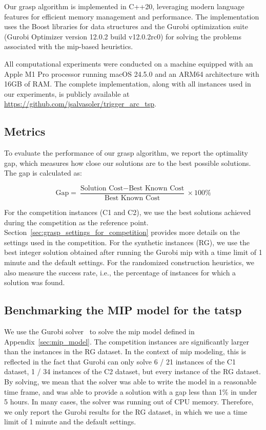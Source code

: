\documentclass[twocolumn, switch]{article} %
\begin{document}
Our \gls{grasp} algorithm is implemented in C++20, leveraging modern language features for efficient memory management and performance.
The implementation uses the Boost libraries for data structures and the Gurobi optimization suite (Gurobi Optimizer version 12.0.2 build v12.0.2rc0) for solving the problems associated with the \gls{mip}-based heuristics.

All computational experiments were conducted on a machine equipped with an Apple M1 Pro processor running macOS 24.5.0 and an ARM64 architecture with 16GB of RAM.
The complete implementation, along with all instances used in our experiments, is publicly available at \url{https://github.com/jsalvasoler/trigger_arc_tsp}.

\subsection{Metrics}

To evaluate the performance of our \gls{grasp} algorithm, we report the optimality gap, which measures how close our solutions are to the best possible solutions. The gap is calculated as:

\begin{equation}
\text{Gap} = \frac{\text{Solution Cost} - \text{Best Known Cost}}{\text{Best Known Cost}} \times 100\%
\end{equation}

For the competition instances (C1 and C2), we use the best solutions achieved during the competition as the reference point. Section~\ref{sec:grasp_settings_for_competition} provides more details on the settings used in the competition.
For the synthetic instances (RG), we use the best integer solution obtained after running the Gurobi \gls{mip} with a time limit of 1 minute and the default settings.
For the randomized construction heuristics, we also measure the success rate, i.e., the percentage of instances for which a solution was found.

\subsection{Benchmarking the MIP model for the \gls{tatsp}}

We use the Gurobi solver~\cite{gurobi} to solve the \gls{mip} model defined in Appendix~\ref{sec:mip_model}.
The competition instances are significantly larger than the instances in the RG dataset. In the context of \gls{mip} modeling, this is reflected in the fact
that Gurobi can only solve 6 / 21 instances of the C1 dataset, 1 / 34 instances of the C2 dataset, but every instance of the RG dataset.
By solving, we mean that the solver was able to write the model in a reasonable time frame, and was able to provide a solution with a gap less than 1\% in under 5 hours.
In many cases, the solver was running out of CPU memory.
Therefore, we only report the Gurobi results for the RG dataset, in which we use a time limit of 1 minute and the default settings.
\end{document}
